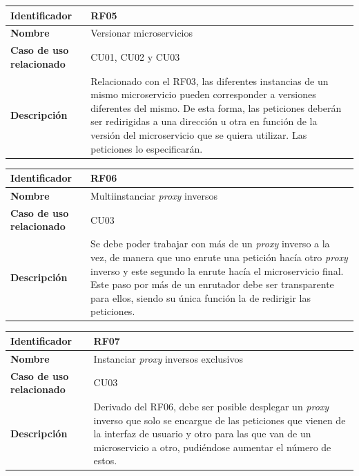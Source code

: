 \documentclass[11pt,spanish,listoffigures]{tfgetsinf}
\begin{document}
\begin{center} \begin{tabular}{| l | p{9.5cm} |}
\hline
\textbf{Identificador} & RF05
\\ \hline
\textbf{Nombre} & Versionar microservicios
\\ \hline
\textbf{Caso de uso relacionado} & CU01, CU02 y CU03
\\ \hline
\textbf{Descripción} & Relacionado con el RF03, las diferentes instancias de un mismo microservicio pueden corresponder a versiones diferentes del mismo. De esta forma, las peticiones deberán ser redirigidas a una dirección u otra en función de la versión del microservicio que se quiera utilizar. Las peticiones lo especificarán.
\\ \hline \end{tabular} \end{center}

\begin{center} \begin{tabular}{| l | p{9.5cm} |}
\hline
\textbf{Identificador} & RF06
\\ \hline
\textbf{Nombre} & Multiinstanciar \emph{proxy} inversos
\\ \hline
\textbf{Caso de uso relacionado} & CU03
\\ \hline
\textbf{Descripción} & Se debe poder trabajar con más de un \emph{proxy} inverso a la vez, de manera que uno enrute una petición hacía otro \emph{proxy} inverso y este segundo la enrute hacía el microservicio final. Este paso por más de un enrutador debe ser transparente para ellos, siendo su única función la de redirigir las peticiones.
\\ \hline \end{tabular} \end{center}

\begin{center} \begin{tabular}{| l | p{9.5cm} |}
\hline
\textbf{Identificador} & RF07
\\ \hline
\textbf{Nombre} & Instanciar \emph{proxy} inversos exclusivos
\\ \hline
\textbf{Caso de uso relacionado} & CU03
\\ \hline
\textbf{Descripción} & Derivado del RF06, debe ser posible desplegar un \emph{proxy} inverso que solo se encargue de las peticiones que vienen de la interfaz de usuario y otro para las que van de un microservicio a otro, pudiéndose aumentar el número de estos.
\\ \hline \end{tabular} \end{center}
\end{document}
